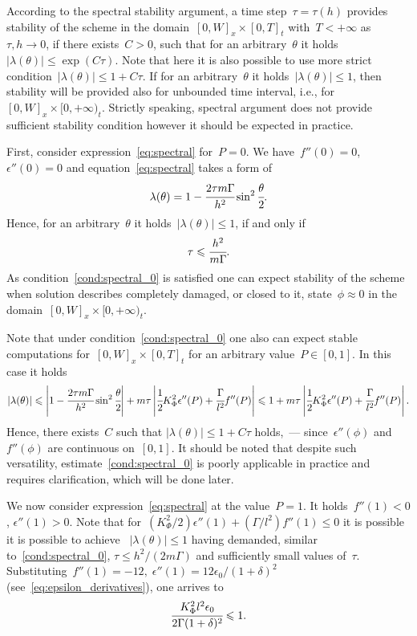 According to the spectral stability argument, a time
step~$\tau = \tau(h)$ provides stability of the scheme in the
domain~$[0, W]_x \times [0, T]_t$ with~$T<+\infty$ as~$\tau, h \to 0$, if there
exists~$C > 0$, such that for an arbitrary~$\theta$ it
holds~$|\lambda(\theta)| \leqslant \exp(C\tau)$.  Note that here it is
also possible to use more strict condition~$|\lambda(\theta)| \leqslant 1 + C\tau$.
If for an arbitrary~$\theta$ it holds~$|\lambda(\theta)| \leqslant 1$,
then stability will be provided also for unbounded time interval, i.e.,
for~$[0, W]_x \times [0, +\infty)_t$.
Strictly speaking, spectral argument does not provide sufficient
stability condition however it should be expected in practice.

First, consider expression~\eqref{eq:spectral} for~$P=0$.
We have~$f''(0) = 0$, $\epsilon''(0) = 0$ and equation~\eqref{eq:spectral}
takes a form of
$$\lambda(\theta) = 1 - \cfrac{2 \tau m \Gamma}{h^2} \sin^2 \cfrac{\theta}{2} {\text{.}}$$
Hence, for an arbitrary~$\theta$ it holds~$|\lambda(\theta)| \leqslant 1$,
if and only if
\begin{equation}
  \tau \leqslant \cfrac{h^2}{m \Gamma} {\text{.}}
  \label{cond:spectral_0}
\end{equation}
As condition~\eqref{cond:spectral_0} is satisfied one can expect stability of the scheme
when solution describes completely damaged, or closed to it, state~$\phi\approx0$
in the domain~$[0, W]_x \times [0, +\infty)_t$.

Note that under condition~\eqref{cond:spectral_0} one also can expect stable computations
for~$[0, W]_x \times [0, T]_t$ for an arbitrary value~$P \in [0, 1]$.
In this case it holds
$$
|\lambda(\theta)| \leqslant \left| 1 - \cfrac{2 \tau m \Gamma}{h^2} \sin^2 \cfrac{\theta}{2} \right| + m \tau \left| \cfrac{1}{2} K_\Phi^2 \epsilon''(P) + \cfrac{\Gamma}{l^2} f''(P) \right| \leqslant 1 + m \tau \left| \cfrac{1}{2} K_\Phi^2 \epsilon''(P) + \cfrac{\Gamma}{l^2} f''(P) \right| {\text{.}}
$$
Hence, there exists~$C$ such that
$|\lambda(\theta)| \leqslant 1 + C \tau$ holds,~--- since~$\epsilon''(\phi)$ and~$f''(\phi)$
are continuous on~$[0, 1]$.
It should be noted that despite such versatility, estimate~\eqref{cond:spectral_0}
is poorly applicable in practice and requires clarification, which will be done later.

We now consider expression~\eqref{eq:spectral} at the value~$P=1$.
It holds~$f''(1) < 0$, $\epsilon''(1) > 0$.
Note that for~$(K_\Phi^2 / 2) \epsilon''(1) + (\Gamma / l^2) f''(1) \leqslant 0$
it is possible it is possible to achieve~ $|\lambda(\theta)| \leqslant 1$
having demanded, similar to~\eqref{cond:spectral_0}, $\tau \leqslant h^2 / (2m \Gamma)$
and sufficiently small values of~$\tau$.
Substituting~$f''(1) = -12, \; \epsilon''(1) = 12 \epsilon_0 / (1 + \delta)^2$ (see~\eqref{eq:epsilon_derivatives}),
one arrives to
\begin{equation}
  \cfrac{K_\Phi^2 l^2 \epsilon_0}{2 \Gamma (1 + \delta)^2} \leqslant 1 {\text{.}}
  \label{cond:spectral_possible_1}
\end{equation}

